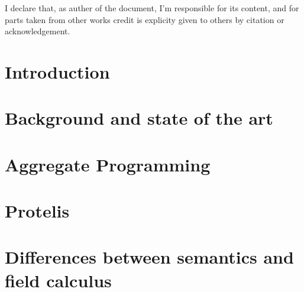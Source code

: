 



\clearpage
 I declare that, as auther of the document, I'm responsible for its content, and for parts taken from other works credit is explicity given to others by citation or acknowledgement.
\thispagestyle{empty}

\maketitle

\clearpage\null\thispagestyle{empty}

\tableofcontents

\chapter{Introduction}\label{chap:intro}



\chapter{Background and state of the art}\label{chap:history}



\chapter{Aggregate Programming}\label{chap:aggregate}



\chapter{Protelis}\label{chap:protelis}



\chapter{\Scafi{}}\label{chap:scafi}



\chapter{Differences between \Scafi{} semantics and field calculus}\label{chap:comparison}

